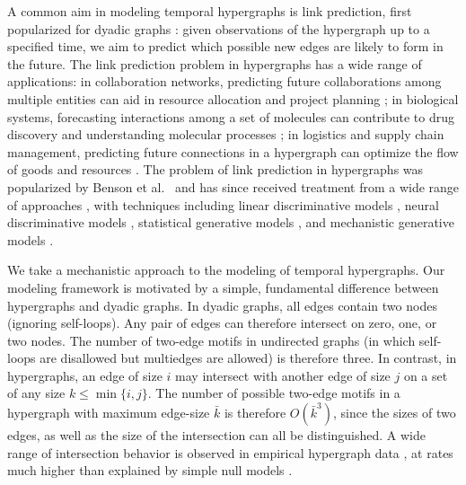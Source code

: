 A common aim in modeling temporal hypergraphs is link prediction, first popularized for dyadic graphs \cite{liben-nowellLinkpredictionProblemSocial2007}: given observations of the hypergraph up to a specified time, we aim to predict which possible new edges are likely to form in the future. 
The link prediction problem in hypergraphs has a wide range of applications: 
in collaboration networks, predicting future collaborations among multiple entities can aid in resource allocation and project planning \cite{zhangHypergraphModelSocial2010}; 
in biological systems, forecasting interactions among a set of molecules can contribute to drug discovery and understanding molecular processes \cite{tavakoliRxnHypergraphHypergraph2022}; 
in logistics and supply chain management, predicting future connections in a hypergraph can optimize the flow of goods and resources \cite{suoExploringEvolutionaryMechanism2018}.
The problem of link prediction in hypergraphs was popularized by Benson et al.~\cite{bensonSimplicialClosureHigherorder2018} and has since received treatment from a wide range of approaches \cite{lizotteHypergraphReconstructionUncertain2023,youngHypergraphReconstructionNetwork2021}, with 
techniques including linear discriminative models \cite{bensonSimplicialClosureHigherorder2018}, neural discriminative models \cite{yadatiNHPNeuralHypergraph2020}, statistical generative models \cite{ruggeriCommunityDetectionLarge2023}, and mechanistic generative models \cite{bensonSequencesSets2018,avinRandomPreferentialAttachment2019,giroirePreferentialAttachmentHypergraph2022,giroirePreferentialAttachmentHypergraph2022a}. 

We take a mechanistic approach to the modeling of temporal hypergraphs. 
Our modeling framework is motivated by a simple, fundamental difference between hypergraphs and dyadic graphs. 
In dyadic graphs, all edges contain two nodes (ignoring self-loops). 
Any pair of edges can therefore intersect on zero, one, or two nodes. 
The number of two-edge motifs \cite{miloNetworkMotifsSimple2002} in undirected graphs (in which self-loops are disallowed but multiedges are allowed) is therefore three. 
In contrast, in hypergraphs, an edge of size $i$ may intersect with another edge of size $j$ on a set of any size $k \leq \min\{i,j\}$. 
The number of possible two-edge motifs in a hypergraph \cite{leeHypergraphMotifsConcepts2020,lotitoHigherorderMotifAnalysis2022} with maximum edge-size $\bar{k}$ is therefore $O(\bar{k}^3)$, since the sizes of two edges, as well as the size of the intersection can all be distinguished. 
A wide range of intersection behavior is observed in empirical hypergraph data \cite{leeHowHyperedgesOverlap2021}, at rates much higher than explained by simple null models \cite{chodrowConfigurationModelsRandom2020}. 


